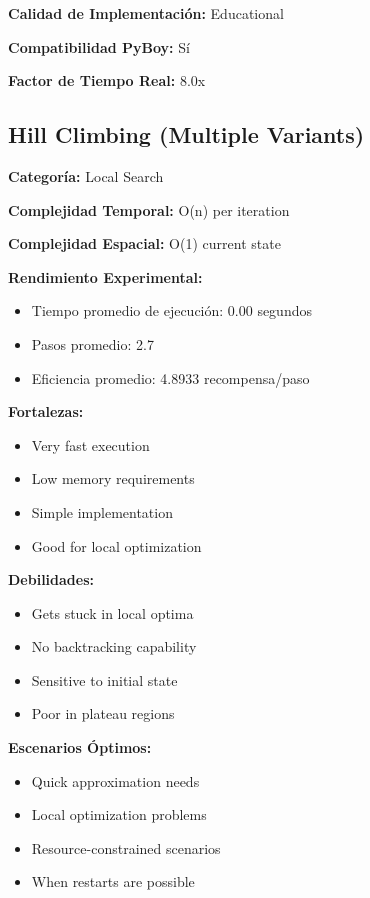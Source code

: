 \textbf{Calidad de Implementación:} Educational

\textbf{Compatibilidad PyBoy:} Sí

\textbf{Factor de Tiempo Real:} 8.0x



\subsection{Hill Climbing (Multiple Variants)}

\textbf{Categoría:} Local Search

\textbf{Complejidad Temporal:} O(n) per iteration

\textbf{Complejidad Espacial:} O(1) current state

\textbf{Rendimiento Experimental:}
\begin{itemize}
    \item Tiempo promedio de ejecución: 0.00 segundos
    \item Pasos promedio: 2.7
    \item Eficiencia promedio: 4.8933 recompensa/paso
\end{itemize}

\textbf{Fortalezas:}
\begin{itemize}
    \item Very fast execution
    \item Low memory requirements
    \item Simple implementation
    \item Good for local optimization
\end{itemize}

\textbf{Debilidades:}
\begin{itemize}
    \item Gets stuck in local optima
    \item No backtracking capability
    \item Sensitive to initial state
    \item Poor in plateau regions
\end{itemize}

\textbf{Escenarios Óptimos:}
\begin{itemize}
    \item Quick approximation needs
    \item Local optimization problems
    \item Resource-constrained scenarios
    \item When restarts are possible
\end{itemize}

